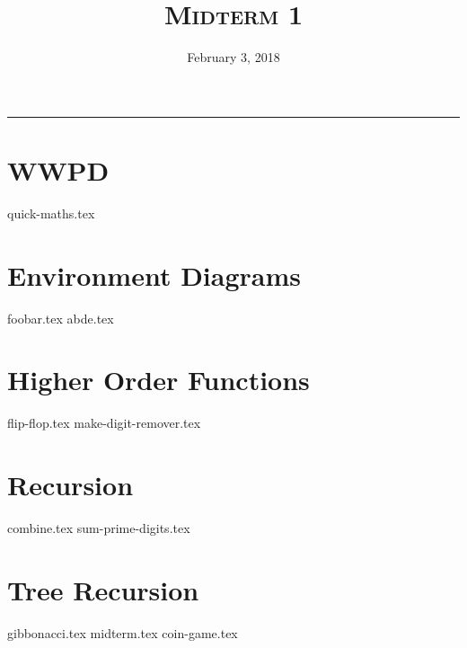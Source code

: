 \documentclass{exam}
\title{\textsc{Midterm 1}}
\date{February 3, 2018}
\begin{document}
\maketitle
\rule{\textwidth}{0.15em}
\fontsize{12}{15}\selectfont


\section{WWPD}
\begin{questions}
{quick-maths.tex}
\end{questions}

\newpage
\section{Environment Diagrams}
\begin{questions}
{foobar.tex}
\newpage
{abde.tex}
\end{questions}

\newpage
\section{Higher Order Functions}
\begin{questions}
{flip-flop.tex}
\newpage
{make-digit-remover.tex}
\end{questions}

\newpage
\section{Recursion}
\begin{questions}
{combine.tex}
{sum-prime-digits.tex}
\end{questions}

\newpage
\section{Tree Recursion}
\begin{questions}
{gibbonacci.tex}
{midterm.tex}
{coin-game.tex}
\end{questions}
\end{document}
